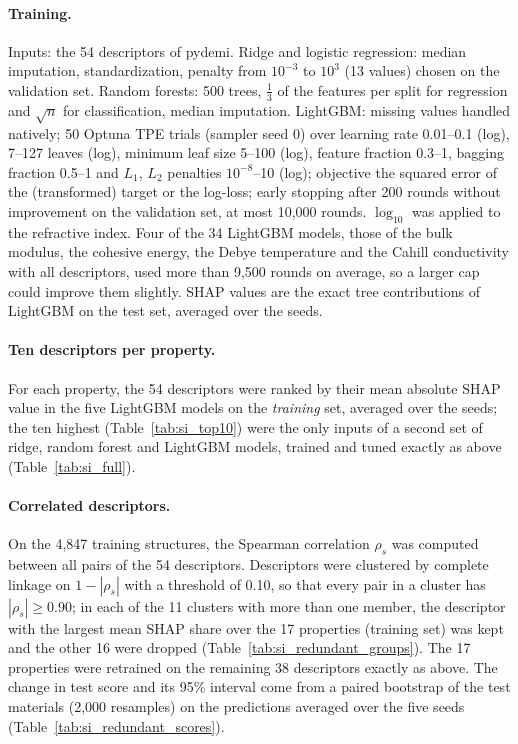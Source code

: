 \documentclass[journal=jctcce,manuscript=suppinfo,email=true]{achemso}
\newcommand{\rev}[1]{{\color{blue}#1}}
\begin{document}
\paragraph{Training.} Inputs: the \rev{54} descriptors of pydemi. Ridge and logistic regression: median
imputation, standardization, penalty from $10^{-3}$ to $10^{3}$ (13 values)
chosen on the validation set. Random forests: 500 trees, $\frac13$ of the
features per split for regression and $\sqrt{n}$ for classification, median
imputation. LightGBM: missing values handled natively; 50 Optuna TPE trials
(sampler seed 0) over learning rate 0.01--0.1 (log), 7--127 leaves (log),
minimum leaf size 5--100 (log), feature fraction 0.3--1, bagging fraction
0.5--1 and $L_1$, $L_2$ penalties $10^{-8}$--10 (log); objective the squared
error of the (transformed) target or the log-loss; early stopping after 200
rounds without improvement on the validation set, at most 10,000 rounds.
$\log_{10}$ was applied to the refractive index. \rev{Four} of the 34 LightGBM models, those of \rev{the bulk modulus,} the cohesive energy, the Debye temperature and the Cahill conductivity with all descriptors, used more than 9,500 rounds on average, so a larger cap could improve them slightly. SHAP values are the
exact tree contributions of LightGBM on the test set, averaged over the seeds.

\paragraph{Ten descriptors per property.} For each property, the \rev{54} descriptors
were ranked by their mean absolute SHAP value in the five LightGBM models on the
\emph{training} set, averaged over the seeds; the ten highest
(Table~\ref{tab:si_top10}) were the only inputs of a second set of ridge, random
forest and LightGBM models, trained and tuned exactly as above
(Table~\ref{tab:si_full}).

\paragraph{Correlated descriptors.} On the 4,847 training structures, the
Spearman correlation $\rho_s$ was computed between all pairs of the \rev{54}
descriptors. Descriptors were clustered by complete linkage on $1-|\rho_s|$ with
a threshold of 0.10, so that every pair in a cluster has $|\rho_s|\geq0.90$;
in each of the 11 clusters with more than one member, the descriptor with the
largest mean SHAP share over the 17 properties (training set) was kept and the
other \rev{16} were dropped (Table~\ref{tab:si_redundant_groups}). The 17 properties
were retrained on the remaining \rev{38} descriptors exactly as above. The change in
test score and its 95\% interval come from a paired bootstrap of the test
materials (2,000 resamples) on the predictions averaged over the five seeds
(Table~\ref{tab:si_redundant_scores}).
\end{document}
